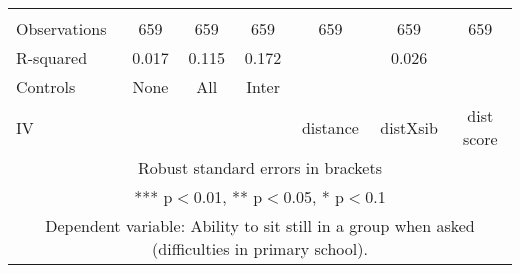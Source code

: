 \begin{tabular}{lcccccc}
 &  &  &  &  &  &  \\
Observations & 659 & 659 & 659 & 659 & 659 & 659 \\
R-squared & 0.017 & 0.115 & 0.172 &  & 0.026 &  \\
Controls & None & All & Inter &  &  &  \\
 IV &  &  &  & distance & distXsib & dist score \\ \hline
\multicolumn{7}{c}{ Robust standard errors in brackets} \\
\multicolumn{7}{c}{ *** p$<$0.01, ** p$<$0.05, * p$<$0.1} \\
\multicolumn{7}{c}{ Dependent variable: Ability to sit still in a group when asked (difficulties in primary school).} \\
\end{tabular}
